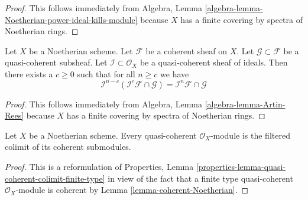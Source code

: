 \begin{proof}
This follows immediately from
Algebra, Lemma \ref{algebra-lemma-Noetherian-power-ideal-kills-module}
because $X$ has a finite covering by spectra of Noetherian rings.
\end{proof}

\begin{lemma}
\label{lemma-Artin-Rees}
Let $X$ be a Noetherian scheme.
Let $\mathcal{F}$ be a coherent sheaf on $X$.
Let $\mathcal{G} \subset \mathcal{F}$ be a quasi-coherent subsheaf.
Let $\mathcal{I} \subset \mathcal{O}_X$ be a quasi-coherent sheaf of
ideals.
Then there exists a $c \geq 0$ such that for all $n \geq c$ we
have
$$
\mathcal{I}^{n - c}(\mathcal{I}^c\mathcal{F} \cap \mathcal{G})
=
\mathcal{I}^n\mathcal{F} \cap \mathcal{G}
$$
\end{lemma}

\begin{proof}
This follows immediately from
Algebra, Lemma \ref{algebra-lemma-Artin-Rees}
because $X$ has a finite covering by spectra of Noetherian rings.
\end{proof}

\begin{lemma}
\label{lemma-directed-colimit-coherent}
Let $X$ be a Noetherian scheme. Every quasi-coherent $\mathcal{O}_X$-module
is the filtered colimit of its coherent submodules.
\end{lemma}

\begin{proof}
This is a reformulation of Properties, Lemma
\ref{properties-lemma-quasi-coherent-colimit-finite-type}
in view of the fact that a finite type quasi-coherent
$\mathcal{O}_X$-module is coherent by
Lemma \ref{lemma-coherent-Noetherian}.
\end{proof}

